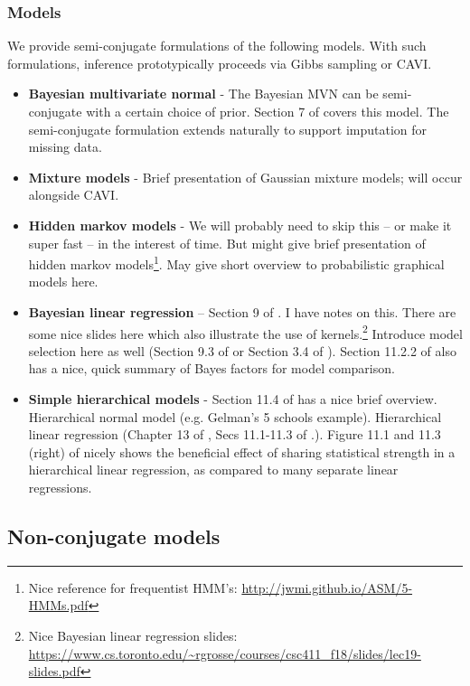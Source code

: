 \documentclass{article} %
\begin{document}
\subsubsection{Models}
We provide semi-conjugate formulations of the following models.  With such formulations, inference prototypically proceeds via Gibbs sampling or CAVI. 

\begin{itemize}
	\item \textbf{Bayesian multivariate normal} -  The Bayesian MVN can be semi-conjugate with a certain choice of prior. Section 7 of \cite{hoff2009first} covers this model.  The semi-conjugate formulation extends naturally to support imputation for missing data.  
\item \textbf{Mixture models} - Brief presentation of Gaussian mixture models; will occur alongside CAVI.
\item \textbf{Hidden markov models} -   We will probably need to skip this -- or make it super fast -- in the interest of time.   But might give brief presentation of hidden markov models\footnote{Nice reference for frequentist HMM's: \url{http://jwmi.github.io/ASM/5-HMMs.pdf}}. May give short overview to probabilistic graphical models here.
\item \textbf{Bayesian linear regression} -- Section 9 of \cite{hoff2009first}.     I have notes on this.   There are some nice slides here which also illustrate the use of kernels.\footnote{Nice Bayesian linear regression slides: \url{https://www.cs.toronto.edu/~rgrosse/courses/csc411_f18/slides/lec19-slides.pdf}}   Introduce model selection here as well (Section 9.3 of \cite{hoff2009first} or Section 3.4 of \cite{bishop2006pattern}).   Section 11.2.2 of \cite{davison2003statistical} also has a nice,  quick summary of Bayes factors for model comparison.   
\item \textbf{Simple hierarchical models} - Section 11.4 of \cite{davison2003statistical} has a nice brief overview.    Hierarchical normal model (e.g. Gelman's 5 schools example).   Hierarchical linear regression (Chapter 13 of \cite{gelman2013bayesian},   Secs 11.1-11.3 of \cite{hoff2009first}.).  Figure 11.1 and 11.3 (right) of \cite{hoff2009first} nicely shows the beneficial effect of sharing statistical strength in a hierarchical linear regression,  as compared to many separate linear regressions.  
\end{itemize}

\subsection{Non-conjugate models} \label{sec:non_conjugacy}
\end{document}

